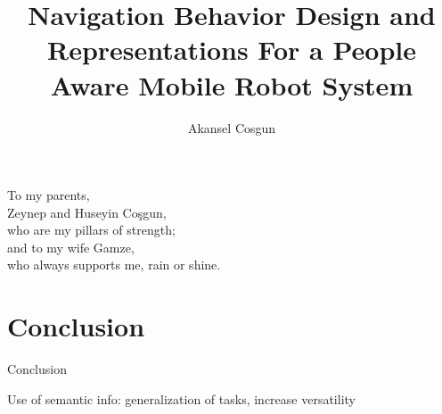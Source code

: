 \documentclass[12pt]{gatech-thesis}
\title{Navigation Behavior Design and Representations For a People Aware Mobile Robot System}
\author{Akansel Cosgun}
\begin{document}
%

\begin{preliminary}

\begin{dedication}
\null\vfil
{\large
\begin{center}
To my parents,\\\vspace{12pt}
Zeynep and Huseyin Co\c{s}gun,\\\vspace{12pt}
who are my pillars of strength;\\\vspace{12pt}
and to my wife Gamze,\\\vspace{12pt}
who always supports me, rain or shine.\\\vspace{12pt}
\end{center}}
\vfil\null
\end{dedication}




\contents

\end{preliminary}









\chapter{Conclusion}
\label{chapter:conclusion}

Conclusion

Use of semantic info: generalization of tasks, increase versatility

\appendix

%
%
%
\end{document}
